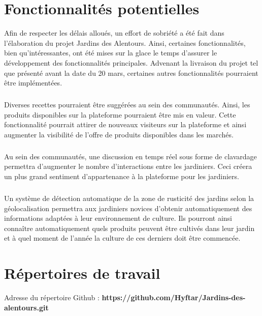 \documentclass{scrreprt}
\def\projectname{Jardins des Alentours}
\begin{document}
\appendix

\chapter{Fonctionnalités potentielles}
Afin de respecter les délais alloués, un effort de sobriété a été fait dans
l'élaboration du projet \projectname{}. Ainsi, certaines fonctionnalités,
bien qu'intéressantes, ont été mises sur la glace le temps d'assurer le
développement des fonctionnalités principales. Advenant la livraison du projet
tel que présenté avant la date du 20 mars, certaines autres fonctionnalités
pourraient être implémentées.

\paragraph{}
Diverses recettes pourraient être suggérées au sein des communautés. Ainsi,
les produits disponibles sur la plateforme pourraient être mis en valeur.
Cette fonctionnalité pourrait attirer de nouveaux visiteurs sur la plateforme
et ainsi augmenter la visibilité de l'offre de produits disponibles dans les
marchés.

\paragraph{}
Au sein des communautés, une discussion en temps réel sous forme de clavardage
permettra d'augmenter le nombre d'interactions entre les jardiniers. Ceci
créera un plus grand sentiment d'appartenance à la plateforme pour les jardiniers.

\paragraph{}
Un système de détection automatique de la zone de rusticité des jardins selon la
géolocalisation permettra aux jardiniers novices d'obtenir automatiquement des informations
adaptées à leur environnement de culture. Ils pourront ainsi connaître automatiquement
quels produits peuvent être cultivés dans leur jardin et à quel moment de l'année
la culture de ces derniers doit être commencée.

\chapter{Répertoires de travail}
Adresse du répertoire Github : \textbf{https://github.com/Hyftar/Jardins-des-alentours.git}
\end{document}

